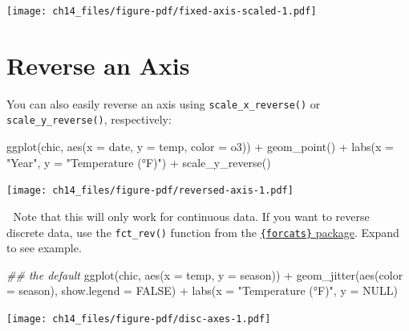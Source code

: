 \documentclass[
  letterpaper,
  DIV=11,
  numbers=noendperiod]{scrreprt}
\newenvironment{Shaded}{\begin{snugshade}}{\end{snugshade}}
\newcommand{\AttributeTok}[1]{\textcolor[rgb]{0.40,0.45,0.13}{#1}}
\newcommand{\ConstantTok}[1]{\textcolor[rgb]{0.56,0.35,0.01}{#1}}
\newcommand{\DocumentationTok}[1]{\textcolor[rgb]{0.37,0.37,0.37}{\textit{#1}}}
\newcommand{\FunctionTok}[1]{\textcolor[rgb]{0.28,0.35,0.67}{#1}}
\newcommand{\NormalTok}[1]{\textcolor[rgb]{0.00,0.23,0.31}{#1}}
\newcommand{\SpecialCharTok}[1]{\textcolor[rgb]{0.37,0.37,0.37}{#1}}
\newcommand{\StringTok}[1]{\textcolor[rgb]{0.13,0.47,0.30}{#1}}
\begin{document}
\texttt{[image: ch14\_files/figure-pdf/fixed-axis-scaled-1.pdf]}

\section{Reverse an Axis}\label{reverse-an-axis}

You can also easily reverse an axis using \texttt{scale\_x\_reverse()}
or \texttt{scale\_y\_reverse()}, respectively:

\begin{Shaded}
\begin{Highlighting}[]
\FunctionTok{ggplot}\NormalTok{(chic, }\FunctionTok{aes}\NormalTok{(}\AttributeTok{x =}\NormalTok{ date, }\AttributeTok{y =}\NormalTok{ temp, }\AttributeTok{color =}\NormalTok{ o3)) }\SpecialCharTok{+}
  \FunctionTok{geom\_point}\NormalTok{() }\SpecialCharTok{+}
  \FunctionTok{labs}\NormalTok{(}\AttributeTok{x =} \StringTok{"Year"}\NormalTok{, }\AttributeTok{y =} \StringTok{"Temperature (°F)"}\NormalTok{) }\SpecialCharTok{+}
  \FunctionTok{scale\_y\_reverse}\NormalTok{()}
\end{Highlighting}
\end{Shaded}

\texttt{[image: ch14\_files/figure-pdf/reversed-axis-1.pdf]}

💁 Note that this will only work for continuous data. If you want to
reverse discrete data, use the \texttt{fct\_rev()} function from the
\href{https://forcats.tidyverse.org/}{\texttt{\{forcats\}} package}.
Expand to see example.

\begin{Shaded}
\begin{Highlighting}[]
\DocumentationTok{\#\# the default}
\FunctionTok{ggplot}\NormalTok{(chic, }\FunctionTok{aes}\NormalTok{(}\AttributeTok{x =}\NormalTok{ temp, }\AttributeTok{y =}\NormalTok{ season)) }\SpecialCharTok{+}
  \FunctionTok{geom\_jitter}\NormalTok{(}\FunctionTok{aes}\NormalTok{(}\AttributeTok{color =}\NormalTok{ season), }\AttributeTok{show.legend =} \ConstantTok{FALSE}\NormalTok{) }\SpecialCharTok{+}
  \FunctionTok{labs}\NormalTok{(}\AttributeTok{x =} \StringTok{"Temperature (°F)"}\NormalTok{, }\AttributeTok{y =} \ConstantTok{NULL}\NormalTok{)}
\end{Highlighting}
\end{Shaded}

\texttt{[image: ch14\_files/figure-pdf/disc-axes-1.pdf]}
\end{document}
